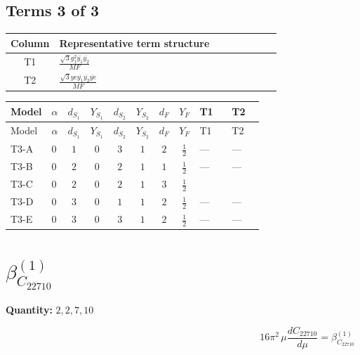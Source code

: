 \documentclass[8pt]{article}
\begin{document}
\begin{landscape}
\subsection*{Terms 3 of 3}
\begin{center}
\begin{tabular}{@{}c >{\raggedright\arraybackslash}p{0.82\linewidth}@{}}
\toprule
Column & Representative term structure \\
\midrule
T1 & \(\displaystyle \frac{\sqrt{3} g_{1}^{2} \overline{y_{1}} \overline{y_{2}}}{MF}\) \\
\midrule
T2 & \(\displaystyle \frac{\sqrt{3} ye \overline{y_{1}} \overline{y_{2}} \overline{ye}}{MF}\) \\
\midrule
\bottomrule
\end{tabular}
\end{center}
\smallskip
\tiny
\begin{longtable}{@{}llcccccc >{\raggedright\arraybackslash}p{0.21\linewidth} >{\raggedright\arraybackslash}p{0.21\linewidth}@{}}
\toprule
Model & $\alpha$ & $d_{S_1}$ & $Y_{S_1}$ & $d_{S_2}$ & $Y_{S_2}$ & $d_F$ & $Y_F$ & T1 & T2 \\
\midrule
\endfirsthead
\toprule
Model & $\alpha$ & $d_{S_1}$ & $Y_{S_1}$ & $d_{S_2}$ & $Y_{S_2}$ & $d_F$ & $Y_F$ & T1 & T2 \\
\midrule
\endhead
T3-A & $0$ & $1$ & $0$ & $3$ & $1$ & $2$ & $\frac{1}{2}$ & --- & --- \\
\midrule
T3-B & $0$ & $2$ & $0$ & $2$ & $1$ & $1$ & $\frac{1}{2}$ & --- & --- \\
\midrule
T3-C & $0$ & $2$ & $0$ & $2$ & $1$ & $3$ & $\frac{1}{2}$ & \scriptsize\adjustbox{max width=\linewidth}{$\begin{gathered} - \frac{\sqrt{3} g_{1}^{2} \overline{y_{1}} \overline{y_{2}}}{8 MF}\end{gathered}$} & \scriptsize\adjustbox{max width=\linewidth}{$\begin{gathered} \frac{\sqrt{3} ye \overline{y_{1}} \overline{y_{2}} \overline{ye}}{12 MF}\end{gathered}$} \\
\midrule
T3-D & $0$ & $3$ & $0$ & $1$ & $1$ & $2$ & $\frac{1}{2}$ & --- & --- \\
\midrule
T3-E & $0$ & $3$ & $0$ & $3$ & $1$ & $2$ & $\frac{1}{2}$ & --- & --- \\
\midrule
\bottomrule
\end{longtable}
\clearpage
\section*{$\beta_{C_{22710}}^{(1)}$}
\noindent\textbf{Quantity: }$\mathrm{2,2,7,10}$\par\smallskip
\[16\pi^2\,\mu\frac{d C_{22710}}{d\mu}=\beta_{C_{22710}}^{(1)}\]

\end{landscape}
\end{document}
